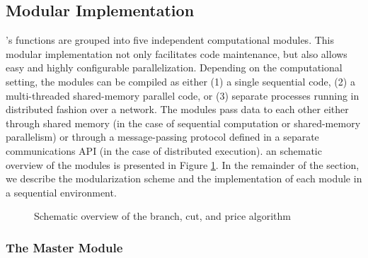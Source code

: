 \subsection{Modular Implementation}
\label{SYMPHONY-modules}

\BB's functions are grouped into five independent computational
modules. This modular implementation not only facilitates code
maintenance, but also allows easy and highly configurable
parallelization. Depending on the computational setting, the modules
can be compiled as either (1) a single sequential code, (2) a
multi-threaded shared-memory parallel code, or (3) separate processes
running in distributed fashion over a network. The modules pass data
to each other either through shared memory (in the case of sequential
computation or shared-memory parallelism) or through a message-passing
protocol defined in a separate communications API (in the case of
distributed execution). an schematic overview of the modules is
presented in Figure \ref{overview}. In the remainder of the section,
we describe the modularization scheme and the implementation of each
module in a sequential environment. 

\begin{figure}
\centering
{}
\caption{Schematic overview of the branch, cut, and price algorithm}
\label{overview}
\end{figure}

\subsubsection{The Master Module}
\label{master-process}


